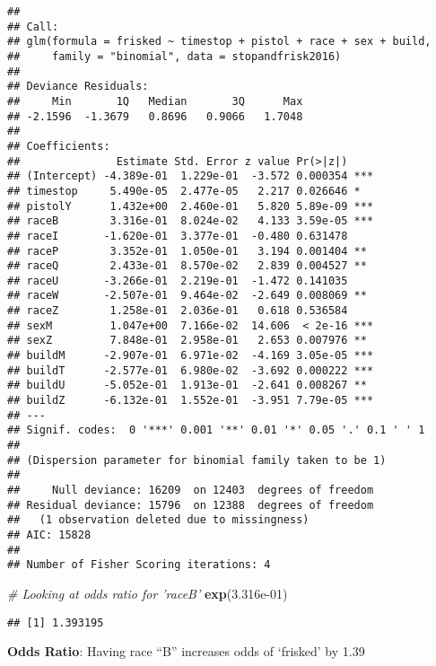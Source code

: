 \documentclass[]{article}
\newenvironment{Shaded}{\begin{snugshade}}{\end{snugshade}}
\newcommand{\CommentTok}[1]{\textcolor[rgb]{0.56,0.35,0.01}{\textit{#1}}}
\newcommand{\FloatTok}[1]{\textcolor[rgb]{0.00,0.00,0.81}{#1}}
\newcommand{\KeywordTok}[1]{\textcolor[rgb]{0.13,0.29,0.53}{\textbf{#1}}}
\newcommand{\NormalTok}[1]{#1}
\begin{document}
\begin{verbatim}
## 
## Call:
## glm(formula = frisked ~ timestop + pistol + race + sex + build, 
##     family = "binomial", data = stopandfrisk2016)
## 
## Deviance Residuals: 
##     Min       1Q   Median       3Q      Max  
## -2.1596  -1.3679   0.8696   0.9066   1.7048  
## 
## Coefficients:
##               Estimate Std. Error z value Pr(>|z|)    
## (Intercept) -4.389e-01  1.229e-01  -3.572 0.000354 ***
## timestop     5.490e-05  2.477e-05   2.217 0.026646 *  
## pistolY      1.432e+00  2.460e-01   5.820 5.89e-09 ***
## raceB        3.316e-01  8.024e-02   4.133 3.59e-05 ***
## raceI       -1.620e-01  3.377e-01  -0.480 0.631478    
## raceP        3.352e-01  1.050e-01   3.194 0.001404 ** 
## raceQ        2.433e-01  8.570e-02   2.839 0.004527 ** 
## raceU       -3.266e-01  2.219e-01  -1.472 0.141035    
## raceW       -2.507e-01  9.464e-02  -2.649 0.008069 ** 
## raceZ        1.258e-01  2.036e-01   0.618 0.536584    
## sexM         1.047e+00  7.166e-02  14.606  < 2e-16 ***
## sexZ         7.848e-01  2.958e-01   2.653 0.007976 ** 
## buildM      -2.907e-01  6.971e-02  -4.169 3.05e-05 ***
## buildT      -2.577e-01  6.980e-02  -3.692 0.000222 ***
## buildU      -5.052e-01  1.913e-01  -2.641 0.008267 ** 
## buildZ      -6.132e-01  1.552e-01  -3.951 7.79e-05 ***
## ---
## Signif. codes:  0 '***' 0.001 '**' 0.01 '*' 0.05 '.' 0.1 ' ' 1
## 
## (Dispersion parameter for binomial family taken to be 1)
## 
##     Null deviance: 16209  on 12403  degrees of freedom
## Residual deviance: 15796  on 12388  degrees of freedom
##   (1 observation deleted due to missingness)
## AIC: 15828
## 
## Number of Fisher Scoring iterations: 4
\end{verbatim}

\begin{Shaded}
\begin{Highlighting}[]
\CommentTok{# Looking at odds ratio for 'raceB'}
\KeywordTok{exp}\NormalTok{(}\FloatTok{3.316e-01}\NormalTok{) }
\end{Highlighting}
\end{Shaded}

\begin{verbatim}
## [1] 1.393195
\end{verbatim}

\textbf{Odds Ratio}: Having race ``B'' increases odds of `frisked' by
1.39
\end{document}
